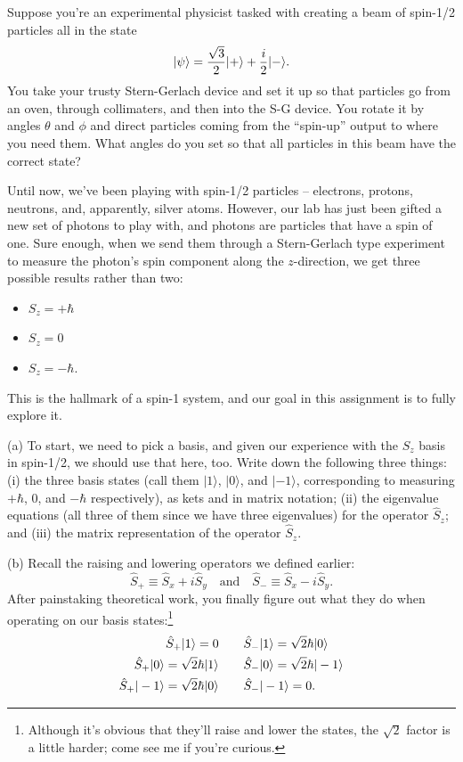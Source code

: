 \begin{problem}
\label{prob_specific_state}
Suppose you're an experimental physicist tasked with creating a beam of spin-1/2 particles all in the state
\[
| \psi \rangle = \frac{\sqrt{3}}{2} | + \rangle + \frac{i}{2} | - \rangle.
\]
You take your trusty Stern-Gerlach device and set it up so that particles go from an oven, through collimaters, and then into the S-G device.  You rotate it by angles $\theta$ and $\phi$ and direct particles coming from the ``spin-up'' output to where you need them.  What angles do you set so that all particles in this beam have the correct state?
\end{problem}

\begin{problem}[Spin-1]

Until now, we've been playing with spin-1/2 particles -- electrons, protons, neutrons, and, apparently, silver atoms.  However, our lab has just been gifted a new set of photons to play with, and photons are particles that have a spin of one.  Sure enough, when we send them through a Stern-Gerlach type experiment to measure the photon's spin component along the $z$-direction, we get three possible results rather than two:
\begin{itemize}
\item $S_z = +\hbar$
\item $S_z = 0$
\item $S_z = -\hbar$.
\end{itemize}
This is the hallmark of a spin-1 system, and our goal in this assignment is to fully explore it.

(a) To start, we need to pick a basis, and given our experience with the $S_z$ basis in spin-1/2, we should use that here, too.  Write down the following three things:  (i) the three basis states (call them $|1\rangle$, $|0\rangle$, and $|-1\rangle$, corresponding to measuring $+\hbar$, $0$, and $-\hbar$ respectively), as kets and in matrix notation; (ii) the eigenvalue equations (all three of them since we have three eigenvalues) for the operator $\hat{S}_z$; and (iii) the matrix representation of the operator $\hat{S}_z$.

(b) Recall the raising and lowering operators we defined earlier:
\[
\hat{S}_+ \equiv \hat{S}_x + i\hat{S}_y \quad \text{and} \quad \hat{S}_- \equiv \hat{S}_x - i\hat{S}_y.
\]
After painstaking theoretical work, you finally figure out what they do when operating on our basis states:\footnote{Although it's obvious that they'll raise and lower the states, the $\sqrt{2}$ factor is a little harder; come see me if you're curious.}
\begin{align*}
\hat{S}_+ | 1 \rangle = 0 \quad & \quad \hat{S}_- | 1 \rangle = \sqrt{2} \hbar | 0 \rangle \\
\hat{S}_+ | 0 \rangle = \sqrt{2} \hbar | 1 \rangle \quad & \quad  \hat{S}_- | 0 \rangle = \sqrt{2} \hbar | -1 \rangle \\
\hat{S}_+ | -1 \rangle = \sqrt{2} \hbar | 0 \rangle \quad & \quad  \hat{S}_- | -1 \rangle = 0.
\end{align*}


\end{problem}
